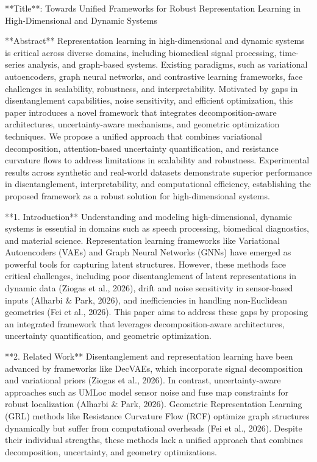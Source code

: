 **Title**: Towards Unified Frameworks for Robust Representation Learning in High-Dimensional and Dynamic Systems  

**Abstract**  
Representation learning in high-dimensional and dynamic systems is critical across diverse domains, including biomedical signal processing, time-series analysis, and graph-based systems. Existing paradigms, such as variational autoencoders, graph neural networks, and contrastive learning frameworks, face challenges in scalability, robustness, and interpretability. Motivated by gaps in disentanglement capabilities, noise sensitivity, and efficient optimization, this paper introduces a novel framework that integrates decomposition-aware architectures, uncertainty-aware mechanisms, and geometric optimization techniques. We propose a unified approach that combines variational decomposition, attention-based uncertainty quantification, and resistance curvature flows to address limitations in scalability and robustness. Experimental results across synthetic and real-world datasets demonstrate superior performance in disentanglement, interpretability, and computational efficiency, establishing the proposed framework as a robust solution for high-dimensional systems.  

**1. Introduction**  
Understanding and modeling high-dimensional, dynamic systems is essential in domains such as speech processing, biomedical diagnostics, and material science. Representation learning frameworks like Variational Autoencoders (VAEs) and Graph Neural Networks (GNNs) have emerged as powerful tools for capturing latent structures. However, these methods face critical challenges, including poor disentanglement of latent representations in dynamic data (Ziogas et al., 2026), drift and noise sensitivity in sensor-based inputs (Alharbi & Park, 2026), and inefficiencies in handling non-Euclidean geometries (Fei et al., 2026). This paper aims to address these gaps by proposing an integrated framework that leverages decomposition-aware architectures, uncertainty quantification, and geometric optimization.  

**2. Related Work**  
Disentanglement and representation learning have been advanced by frameworks like DecVAEs, which incorporate signal decomposition and variational priors (Ziogas et al., 2026). In contrast, uncertainty-aware approaches such as UMLoc model sensor noise and fuse map constraints for robust localization (Alharbi & Park, 2026). Geometric Representation Learning (GRL) methods like Resistance Curvature Flow (RCF) optimize graph structures dynamically but suffer from computational overheads (Fei et al., 2026). Despite their individual strengths, these methods lack a unified approach that combines decomposition, uncertainty, and geometry optimizations.  

